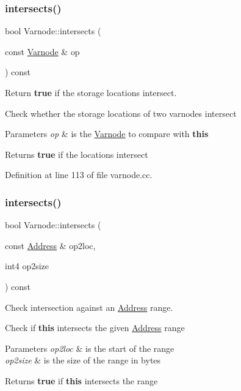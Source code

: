 \subsubsection{\texorpdfstring{intersects()}{intersects()}\hspace{0.1cm}{\footnotesize\ttfamily [1/2]}}
{\footnotesize\ttfamily bool Varnode\+::intersects (\begin{DoxyParamCaption}\item[{const \mbox{\hyperlink{class_varnode}{Varnode}} \&}]{op }\end{DoxyParamCaption}) const}



Return {\bfseries{true}} if the storage locations intersect. 

Check whether the storage locations of two varnodes intersect 
\begin{DoxyParams}{Parameters}
{\em op} & is the \mbox{\hyperlink{class_varnode}{Varnode}} to compare with {\bfseries{this}} \\
\hline
\end{DoxyParams}
\begin{DoxyReturn}{Returns}
{\bfseries{true}} if the locations intersect 
\end{DoxyReturn}


Definition at line 113 of file varnode.\+cc.

\mbox{\label{class_varnode_a74edc3b590c862473137a27517d3777a}} 
\subsubsection{\texorpdfstring{intersects()}{intersects()}\hspace{0.1cm}{\footnotesize\ttfamily [2/2]}}
{\footnotesize\ttfamily bool Varnode\+::intersects (\begin{DoxyParamCaption}\item[{const \mbox{\hyperlink{class_address}{Address}} \&}]{op2loc,  }\item[{int4}]{op2size }\end{DoxyParamCaption}) const}



Check intersection against an \mbox{\hyperlink{class_address}{Address}} range. 

Check if {\bfseries{this}} intersects the given \mbox{\hyperlink{class_address}{Address}} range 
\begin{DoxyParams}{Parameters}
{\em op2loc} & is the start of the range \\
\hline
{\em op2size} & is the size of the range in bytes \\
\hline
\end{DoxyParams}
\begin{DoxyReturn}{Returns}
{\bfseries{true}} if {\bfseries{this}} intersects the range 
\end{DoxyReturn}


